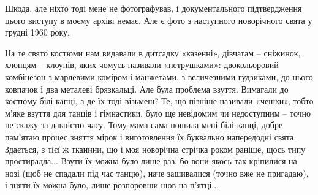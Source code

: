 
Шкода, але ніхто тоді мене не фотографував, і документального підтвердження
цього виступу в моєму архіві немає. Але є фото з наступного новорічного свята у
грудні 1960 року. 

На те свято костюми нам видавали в дитсадку «казенні», дівчатам – сніжинок,
хлопцям – клоунів, яких чомусь називали «петрушками»: двокольоровий комбінезон
з марлевими коміром і манжетами, з величезними гудзиками, до нього ковпачок і
два металеві брязкальці. Але була проблема взуття. Вимагали до костюму білі
капці, а де їх тоді візьмеш? Те, що пізніше називали «чешки», тобто м’яке
взуття для танців і гімнастики, було ще невідомим чи недоступним – точно не
скажу за давністю часу. Тому мама сама пошила мені білі капці, добре пам’ятаю
процес зняття мірок і виготовлення їх буквально напередодні свята. Здається, з
тієї ж тканини, що і моя новорічна стрічка роком раніше, щось типу простирадла...
Взути їх можна було лише раз, бо вони якось так кріпилися на нозі (щоб не
спадали під час танцю), наче зашивалися (точно вже не пригадаю), і зняти їх
можна було, лише розпоровши шов на п’ятці...

